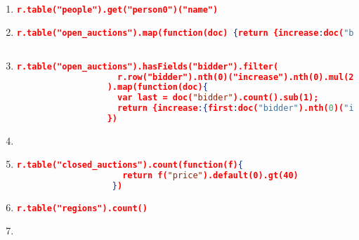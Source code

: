 \label{xmark-queries-rethindb}
\begin{enumerate}[label=Q\arabic*.]
	\item %
	
	\begin{lstlisting}[language=JSON, basicstyle=\scriptsize]
		r.table("people").get("person0")("name")
	\end{lstlisting}

	\item %
	\begin{lstlisting}[language=JSON, basicstyle=\scriptsize]
	r.table("open_auctions").map(function(doc) {return {increase:doc("bidder").nth(0)("increase").nth(0).default("")}})
	
	\end{lstlisting}
	
    \item %
	\begin{lstlisting}[language=JSON, basicstyle=\scriptsize]
	  r.table("open_auctions").hasFields("bidder").filter(
	                r.row("bidder").nth(0)("increase").nth(0).mul(2).le(r.row("bidder").nth(r.row("bidder").count().sub(1))("increase").nth(0))
	              ).map(function(doc){
	                var last = doc("bidder").count().sub(1);
	                return {increase:{first:doc("bidder").nth(0)("increase").nth(0), last:doc("bidder").nth(last)("increase").nth(0)} }
	              })
	\end{lstlisting}
	
	
    \item %
	\begin{lstlisting}[language=JSON, basicstyle=\scriptsize]
	   
	\end{lstlisting}
	
	
    \item %
	\begin{lstlisting}[language=JSON, basicstyle=\scriptsize]
	   r.table("closed_auctions").count(function(f){
	                 return f("price").default(0).gt(40)
	               })
	\end{lstlisting}
	
    \item %
	\begin{lstlisting}[language=JSON, basicstyle=\scriptsize]
	   r.table("regions").count()
	\end{lstlisting}
	
	
    \item %
	\begin{lstlisting}[language=JSON, basicstyle=\scriptsize]
	   

\end{lstlisting}
\end{enumerate}
